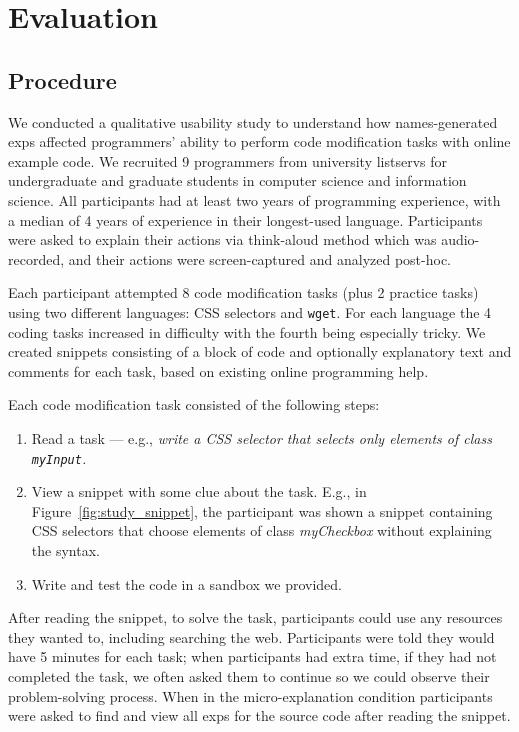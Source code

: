 \section{Evaluation}

\subsection{Procedure}

We conducted a qualitative usability study to understand how \Glspl{name}-generated \glspl{exp} affected programmers' ability to perform code modification tasks with online example code.
We recruited 9 programmers from university listservs for undergraduate and graduate students in computer science and information science.
All participants had at least two years of programming experience, with a median of 4 years of experience in their longest-used language.  Participants were asked to explain their actions via think-aloud method which was audio-recorded, and their actions were screen-captured and analyzed post-hoc. 

Each participant attempted 8 code modification tasks (plus 2 practice tasks) using two different languages: CSS selectors and \texttt{wget}.
For each language the 4 coding tasks increased in difficulty with the fourth being especially tricky.
We created snippets consisting of a block of code and optionally  explanatory text and comments for each task, based on  existing online programming help.

Each code modification task consisted of the following steps:
\begin{enumerate}
\item Read a task --- e.g., \emph{write a CSS selector that selects only elements of class \texttt{myInput}.}
\item View a snippet with some clue about the task.
E.g., in Figure~\ref{fig:study_snippet}, the participant was shown a snippet containing CSS selectors that choose elements of class \emph{myCheckbox} without explaining the syntax.
\item Write and test the code in a sandbox we provided.
\end{enumerate}
After reading the snippet, to solve the task, participants could use any resources they wanted to, including searching the web.
Participants were told they would have 5 minutes for each task; when participants had extra time, if  they had not completed the task, we often asked them to continue so we could observe their problem-solving process. When in the micro-explanation condition participants were asked to find and view all \glspl{exp} for the source code after reading the snippet.

